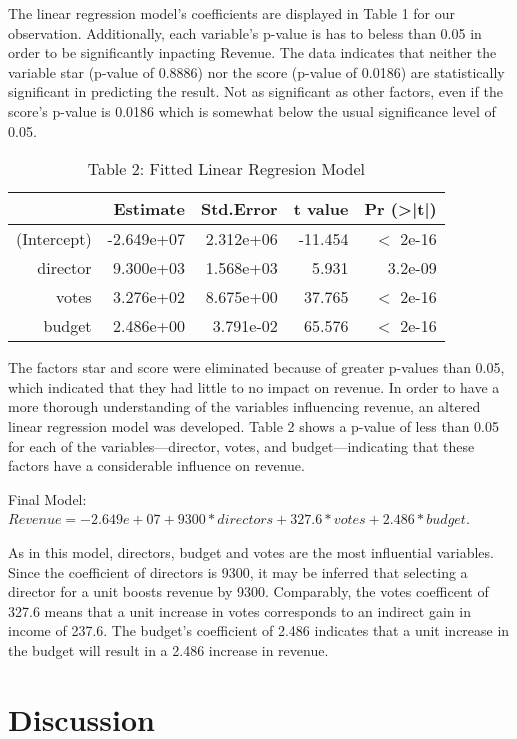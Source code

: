 \documentclass[12pt]{article}
\begin{document}
The linear regression model's coefficients are displayed in Table 1 for our observation. 
Additionally, each variable's p-value is has to beless than 0.05 in order to be significantly
inpacting Revenue. The data indicates that neither the variable star (p-value of 0.8886) 
nor the score (p-value of 0.0186) are statistically significant in predicting the result.
Not as significant as other factors, even if the score's p-value is 0.0186 which is somewhat
below the usual significance level of 0.05.

\begin{table}[h]
\caption{Table 2: Fitted Linear Regresion Model}
\centering
\begin{tabular}{rrrrr}
\hline
 & Estimate   & Std.Error & t value & Pr (\textgreater|t|) \\ 
\hline
(Intercept) & -2.649e+07 & 2.312e+06 & -11.454 & $<$ 2e-16 \\
director    & 9.300e+03  & 1.568e+03 & 5.931   & 3.2e-09 \\
votes       & 3.276e+02  & 8.675e+00 & 37.765  & $<$ 2e-16 \\
budget      & 2.486e+00  & 3.791e-02 & 65.576  & $<$ 2e-16 \\
\hline
\end{tabular}
\end{table}

The factors star and score were eliminated because of greater p-values than 0.05, 
which indicated that they had little to no impact on revenue. In order to have a 
more thorough understanding of the variables influencing revenue, an altered linear 
regression model was developed. Table 2 shows a p-value of less than 0.05 for each 
of the variables—director, votes, and budget—indicating that these factors have a
considerable influence on revenue.

Final Model: 
$Revenue = -2.649e+07 +9300*directors + 327.6*votes + 2.486*budget$.

As in this model, directors, budget and votes are the most influential variables.
Since the coefficient of directors is 9300, it may be inferred that selecting a 
director for a unit boosts revenue by 9300. Comparably, the votes coefficent of 
327.6 means that a unit increase in votes corresponds to an indirect gain in income 
of 237.6. The budget's coefficient of 2.486 indicates that a unit increase in the 
budget will result in a 2.486 increase in revenue.


\section{Discussion}
\label{sec:dis}





\end{document}
